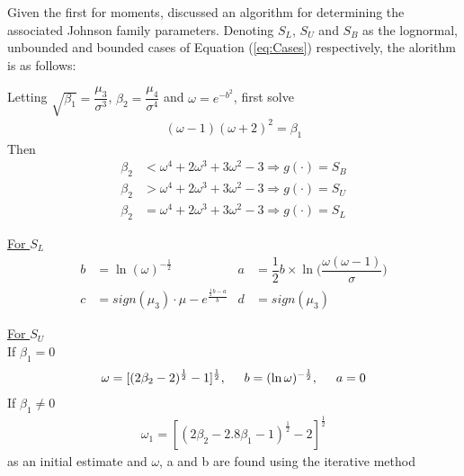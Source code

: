 \documentclass{beamer}
\begin{document}
\begin{frame}
Given the first for moments, \citet{hill1976} discussed an algorithm for determining the associated Johnson family parameters. Denoting $S_L$, $S_U$ and $S_B$ as the lognormal, unbounded and bounded cases of Equation (\ref{eq:Cases}) respectively, the alorithm is as follows:
\vspace{3mm}

Letting $\sqrt{\beta_1} = \dfrac{\mu_3}{\sigma^3}$, $\beta_2 = \dfrac{\mu_4}{\sigma^4}$ and $\omega = e^{-b^2}$, first solve
\begin{align}
(\omega - 1)(\omega + 2)^2 = \beta_1 \nonumber
\end{align}
Then
\begin{align}
\beta_2 &< \omega^4 + 2\omega^3 + 3\omega^2 - 3 \Longrightarrow g(\cdot) = S_B \nonumber \\
\beta_2 &> \omega^4 + 2\omega^3 + 3\omega^2 - 3 \Longrightarrow g(\cdot) = S_U \nonumber \\
\beta_2 &= \omega^4 + 2\omega^3 + 3\omega^2 - 3 \Longrightarrow g(\cdot) = S_L \nonumber
\end{align}
\end{frame}

\begin{frame}
\underline{For $S_L$}
\begin{align}
b &= \ln(\omega)^{-{\frac{1}{2}}} &a& = \dfrac{1}{2}b\times \ln\Big(\dfrac{\omega (\omega -1)}{\sigma}\Big) \nonumber \\
c &= sign(\mu_3)\cdot\mu - e^{\frac{\frac{1}{2}b - a}{b}} &d& = sign(\mu_3) \nonumber
\end{align}

\underline{For $S_U$}\\
\vspace*{3mm}
If $\beta_1 = 0$
\begin{align}
\omega = [(2\beta_2 - 2 )^{\frac{1}{2}} - 1]^{\frac{1}{2}}, \hspace*{5mm} b = (\ln\omega)^{-\frac{1}{2}}, \hspace*{5mm} a = 0 \nonumber
\end{align}
If $\beta_1 \neq 0$
\begin{align}
\omega_1 = [(2\beta_2 - 2.8\beta_1 - 1)^{\frac{1}{2}} - 2]^{\frac{1}{2}} \nonumber
\end{align}
as an initial estimate and $\omega$, a and b are found using the \citet{johnson1969} iterative method 
\end{frame}
\end{document}
